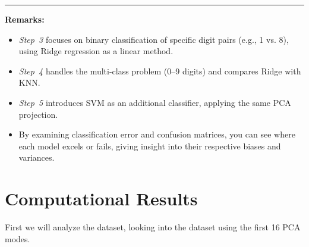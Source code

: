 \documentclass[11pt]{amsart}
\begin{document}
\vspace{1em}
\hrule
\vspace{1em}

\noindent
\textbf{Remarks:}
\begin{itemize}
    \item \emph{Step~3} focuses on binary classification of specific digit pairs (e.g., 1 vs. 8), using Ridge regression as a linear method. 
    \item \emph{Step~4} handles the multi-class problem (0--9 digits) and compares Ridge with KNN. 
    \item \emph{Step~5} introduces SVM as an additional classifier, applying the same PCA projection. 
    \item By examining classification error and confusion matrices, you can see where each model excels or fails, giving insight into their respective biases and variances.
\end{itemize}
    
\section{Computational Results}

First we will analyze the dataset, looking into the dataset using the first 16 PCA modes. 
\end{document}
